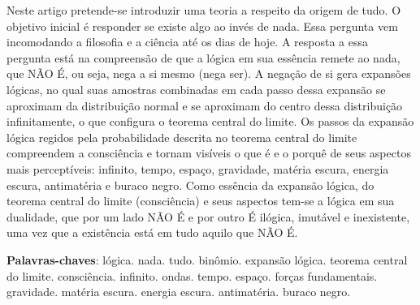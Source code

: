 \vspace{-15mm}
\maketitle
\vspace{-8mm}
\begin{resumoumacoluna}
\vspace{-2mm}
	Neste artigo pretende-se introduzir uma teoria a respeito da origem de tudo. O objetivo inicial é responder se existe algo ao invés de nada. Essa pergunta vem incomodando a filosofia e a ciência até os dias de hoje. A resposta a essa pergunta está na compreensão de que a lógica em sua essência remete ao nada, que NÃO É, ou seja, nega a si mesmo (nega ser). A negação de si gera expansões lógicas, no qual suas amostras combinadas em cada passo dessa expansão se aproximam da distribuição normal e se aproximam do centro dessa distribuição infinitamente, o que configura o teorema central do limite. Os passos da expansão lógica regidos pela probabilidade descrita no teorema central do limite compreendem a consciência e tornam visíveis o que é e o porquê de seus aspectos mais perceptíveis: infinito, tempo, espaço, gravidade, matéria escura, energia escura, antimatéria e buraco negro. Como essência da expansão lógica, do teorema central do limite (consciência) e seus aspectos tem-se a lógica em sua dualidade, que por um lado NÃO É e por outro É ilógica, imutável e inexistente, uma vez que a existência está em tudo aquilo que NÃO É.
 \vspace{\onelineskip} 
 \noindent
 
 \textbf{Palavras-chaves}: lógica. nada. tudo. binômio. expansão lógica. teorema central do limite. consciência. infinito. ondas. tempo. espaço. forças fundamentais. gravidade. matéria escura. energia escura. antimatéria. buraco negro.
\end{resumoumacoluna}

